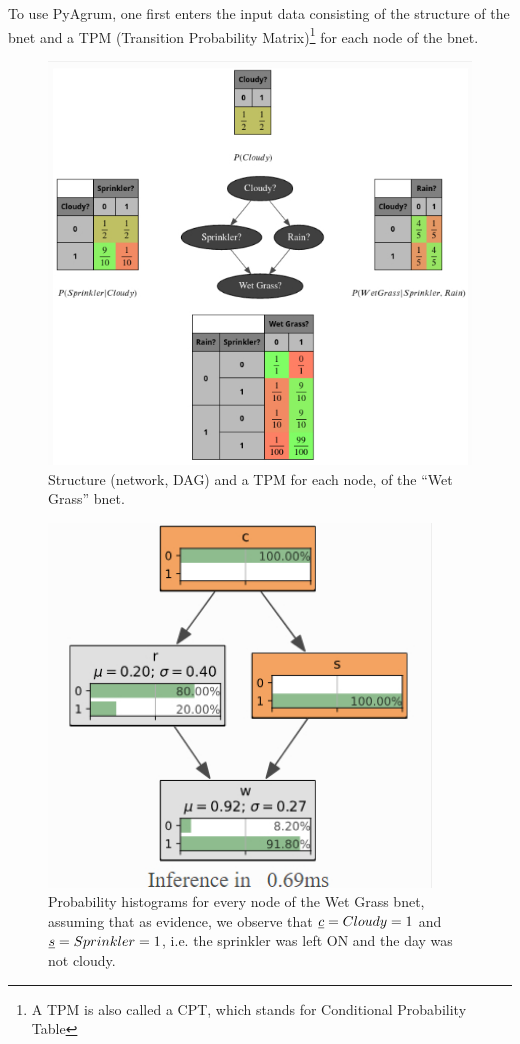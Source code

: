 To use PyAgrum, one first enters the input data consisting of the structure of the bnet and a TPM (Transition Probability Matrix)\footnote{A TPM is also called
a CPT, which stands for Conditional Probability Table}
for each node of the bnet.


\begin{figure}[h!]
\centering
\includegraphics[width=6in]
{bnet-apps/wet-grass-bnet}
\caption{Structure (network, DAG) and a TPM for each node, of the \enquote{Wet
Grass}
bnet.}
\label{fig-wet-grass-bnet}
\end{figure}


\begin{figure}[h!]
\centering
\includegraphics[width=4in]
{bnet-apps/wet-grass-evidence}
\caption{Probability histograms for every node of the Wet Grass bnet,
assuming that as evidence, we observe that ${\underline{c}}=Cloudy=1$ and ${\underline{s}}=Sprinkler=1$, i.e. the sprinkler was left ON and the day was not cloudy.}
\label{fig-wet-grass-evidence}
\end{figure}

